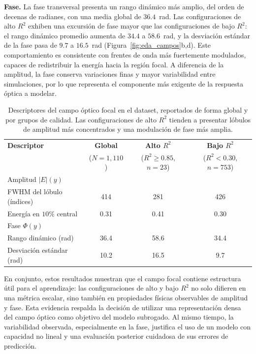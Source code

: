 \textbf{Fase.} La fase transversal presenta un rango dinámico más amplio, del orden de decenas de radianes, con una media global de $36.4$~rad. Las configuraciones de alto $R^2$ exhiben una excursión de fase mayor que las configuraciones de bajo $R^2$: el rango dinámico promedio aumenta de $34.4$ a $58.6$~rad, y la desviación estándar de la fase pasa de $9.7$ a $16.5$~rad (Figura~\ref{fig:eda_campos}b,d). Este comportamiento es consistente con frentes de onda más fuertemente modulados, capaces de redistribuir la energía hacia la región focal. A diferencia de la amplitud, la fase conserva variaciones finas y mayor variabilidad entre simulaciones, por lo que representa el componente más exigente de la respuesta óptica a modelar.

\begin{table}[H]
\centering
\small
\begin{tabular}{lccc}
\toprule
\textbf{Descriptor} & \textbf{Global} & \textbf{Alto $R^2$} & \textbf{Bajo $R^2$} \\
& ($N=1{,}110$) & ($R^2\geq0.85$, $n=23$) & ($R^2<0.30$, $n=753$) \\
\midrule
\multicolumn{4}{l}{Amplitud $|E|(y)$} \\
\quad FWHM del lóbulo (índices) & 414 & 281 & 426 \\
\quad Energía en $10\%$ central & 0.31 & 0.41 & 0.30 \\
\midrule
\multicolumn{4}{l}{Fase $\Phi(y)$} \\
\quad Rango dinámico (rad) & 36.4 & 58.6 & 34.4 \\
\quad Desviación estándar (rad) & 10.2 & 16.5 & 9.7 \\
\bottomrule
\end{tabular}
\caption{Descriptores del campo óptico focal en el dataset, reportados de forma global y por grupos de calidad. Las configuraciones de alto $R^2$ tienden a presentar lóbulos de amplitud más concentrados y una modulación de fase más amplia.}
\label{tab:campo_stats}
\end{table}

En conjunto, estos resultados muestran que el campo focal contiene estructura útil para el aprendizaje: las configuraciones de alto y bajo $R^2$ no solo difieren en una métrica escalar, sino también en propiedades físicas observables de amplitud y fase. Esta evidencia respalda la decisión de utilizar una representación densa del campo óptico como objetivo del modelo subrogado. Al mismo tiempo, la variabilidad observada, especialmente en la fase, justifica el uso de un modelo con capacidad no lineal y una evaluación posterior cuidadosa de sus errores de predicción.

